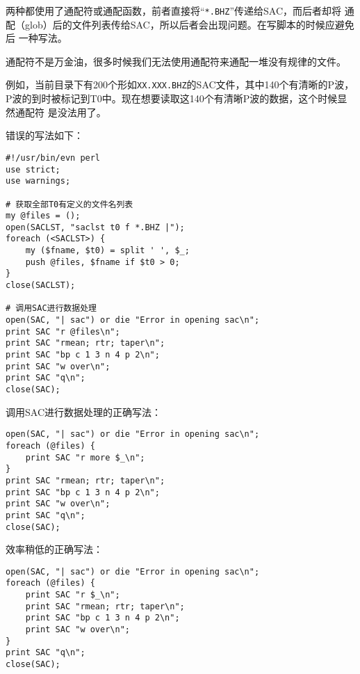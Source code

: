 两种都使用了通配符或通配函数，前者直接将“\verb+*.BHZ+”传递给SAC，而后者却将
通配（glob）后的文件列表传给SAC，所以后者会出现问题。在写脚本的时候应避免后
一种写法。

通配符不是万金油，很多时候我们无法使用通配符来通配一堆没有规律的文件。

例如，当前目录下有200个形如\verb+XX.XXX.BHZ+的SAC文件，其中140个有清晰的P波，
P波的到时被标记到T0中。现在想要读取这140个有清晰P波的数据，这个时候显然通配符
是没法用了。

错误的写法如下：
\begin{verbatim}
#!/usr/bin/evn perl
use strict;
use warnings;

# 获取全部T0有定义的文件名列表
my @files = ();
open(SACLST, "saclst t0 f *.BHZ |");
foreach (<SACLST>) {
    my ($fname, $t0) = split ' ', $_;
    push @files, $fname if $t0 > 0;
}
close(SACLST);

# 调用SAC进行数据处理
open(SAC, "| sac") or die "Error in opening sac\n";
print SAC "r @files\n";
print SAC "rmean; rtr; taper\n";
print SAC "bp c 1 3 n 4 p 2\n";
print SAC "w over\n";
print SAC "q\n";
close(SAC);
\end{verbatim}

调用SAC进行数据处理的正确写法：
\begin{verbatim}
open(SAC, "| sac") or die "Error in opening sac\n";
foreach (@files) {
    print SAC "r more $_\n";
}
print SAC "rmean; rtr; taper\n";
print SAC "bp c 1 3 n 4 p 2\n";
print SAC "w over\n";
print SAC "q\n";
close(SAC);
\end{verbatim}

效率稍低的正确写法：
\begin{verbatim}
open(SAC, "| sac") or die "Error in opening sac\n";
foreach (@files) {
    print SAC "r $_\n";
    print SAC "rmean; rtr; taper\n";
    print SAC "bp c 1 3 n 4 p 2\n";
    print SAC "w over\n";
}
print SAC "q\n";
close(SAC);
\end{verbatim}
